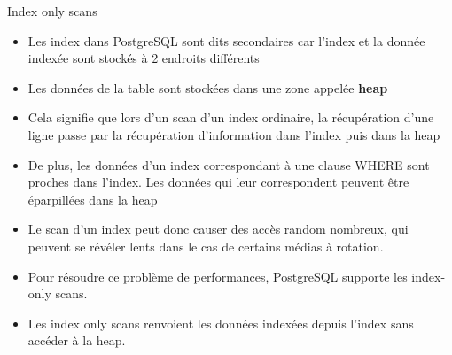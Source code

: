 \begin{frame}[fragile]{Index only scans}
   \label{indexonlyscan}

   \begin{itemize}
      \item Les index dans PostgreSQL sont dits secondaires car l'index et la donnée indexée sont stockés à 2 endroits différents
      \item Les données de la table sont stockées dans une zone appelée \textbf{heap}
      \item Cela signifie que lors d'un scan d'un index ordinaire, la récupération d'une ligne passe par la récupération d'information dans l'index puis dans la heap
      \item De plus, les données d'un index correspondant à une clause WHERE sont proches dans l'index. Les données qui leur correspondent peuvent être éparpillées dans la heap
      \item Le scan d'un index peut donc causer des accès random nombreux, qui peuvent se révéler lents dans le cas de certains médias à rotation.
      \item Pour résoudre ce problème de performances, PostgreSQL supporte les index-only scans. 
      \item Les index only scans renvoient les données indexées depuis l'index sans accéder à la heap.
   \end{itemize}

\begin{toile}
\end{toile}

\end{frame}


